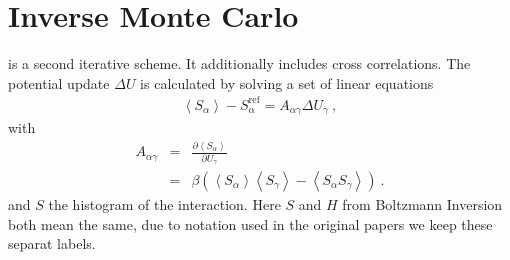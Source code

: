 \section{Inverse Monte Carlo}
\imc is a second iterative scheme. It additionally includes cross correlations. The potential update $\Delta U$ is calculated by solving a set of linear equations
\begin{align}
    \left<S_{\alpha}\right> - S_{\alpha}^{\text{ref}}= A_{\alpha \gamma} \Delta U_{\gamma}~,
  \label{eq:imc}
\end{align}
%
with
\begin{eqnarray}
  \label{eq:covariance}
  A_{\alpha \gamma} &=& \frac{\partial \left< S_{\alpha} \right> }{\partial U_{\gamma}}  \\
  \nonumber
  &=&
  \beta \left( \left<S_{\alpha} \right>\left<S_{\gamma} \right> - \left<S_{\alpha} S_{\gamma} \right>  \right)~.
  \nonumber
\end{eqnarray}
and $S$ the histogram of the interaction. Here $S$ and $H$ from Boltzmann Inversion both mean the same, due to notation used in the original papers we keep these separat labels.